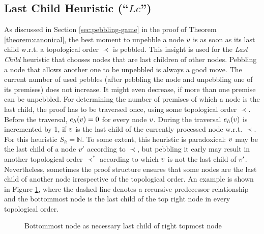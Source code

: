 \subsection{Last Child Heuristic (``$Lc$'')}
\label{sec:lastchild}

As discussed in Section \ref{sec:pebbling-game} in the proof of Theorem \ref{theorem:canonical}, the best moment to unpebble a node $v$ is as soon as its last child w.r.t. a topological order $\prec$ is pebbled. 
This insight is used for the \emph{Last Child} heuristic that chooses nodes that are last children of other nodes. 
Pebbling a node that allows another one to be unpebbled is always a good move. 
The current number of used pebbles (after pebbling the node and unpebbling one of its premises) does not increase.
It might even decrease, if more than one premise can be unpebbled.
For determining the number of premises of which a node is the last child, the proof has to be traversed once, using some topological order $\prec$.
Before the traversal, $e_h(v) = 0$ for every node $v$. 
During the traversal $e_h(v)$ is incremented by 1, if $v$ is the last child of the currently processed node w.r.t. $\prec$. 
For this heuristic $S_h = \mathbb{N}$.
To some extent, this heuristic is paradoxical: $v$ may be the last child of a node $v'$ according to $\prec$, but pebbling it early may result in another topological order $\prec^*$ according to which $v$ is not the last child of $v'$.
Nevertheless, sometimes the proof structure ensures that some nodes are the last child of another node irrespective of the topological order. An example is shown in Figure \ref{fig:forcedLC}, where the dashed line denotes a recursive predecessor relationship and the bottommost node is the last child of the top right node in every topological order.

\begin{figure}[h]
	\caption{Bottommost node as necessary last child of right topmost node}
	\label{fig:forcedLC}
\end{figure}


